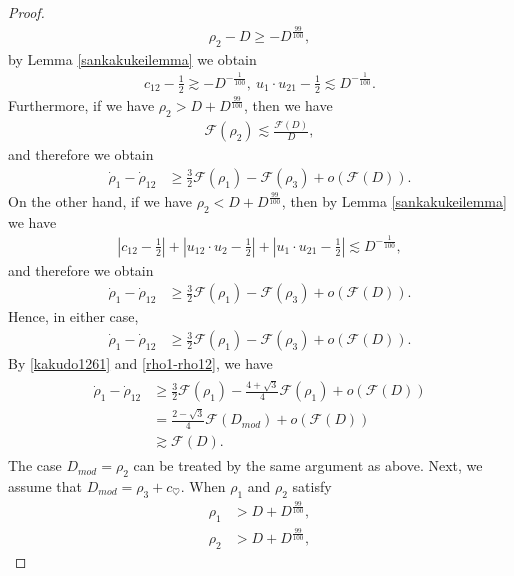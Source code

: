 \documentclass[10pt,a4paper]{amsart}
\begin{document}
\begin{proof}
\begin{align*}
\rho_{2}-D\geq -D^{\frac{99}{100}},
\end{align*}
by Lemma \ref{sankakukeilemma} we obtain
\begin{align}\label{kakudo1261}
c_{12}-\frac{1}{2}\gtrsim -D^{-\frac{1}{100}},\ u_1\cdot u_{21}-\frac{1}{2}\lesssim D^{-\frac{1}{100}}.
\end{align}
Furthermore, if we have $\rho_2>D+D^{\frac{99}{100}}$, then we have
\begin{align*}
\mathcal{F}(\rho_2)\lesssim  \frac{\mathcal{F}(D)}{D},
\end{align*}
and therefore we obtain
\begin{align*}
\dot{\rho}_1-\dot{\rho}_{12}&\geq \frac{3}{2}\mathcal{F}(\rho_1)-\mathcal{F}(\rho_3)+o\left(\mathcal{F}(D)\right).
\end{align*}
On the other hand, if we have $\rho_2<D+D^{\frac{99}{100}}$, then by Lemma \ref{sankakukeilemma} we have
\begin{align*}
\left|c_{12}-\frac{1}{2}\right|+\left|u_{12}\cdot u_2-\frac{1}{2}\right|+\left|u_1\cdot u_{21}-\frac{1}{2}\right|\lesssim D^{-\frac{1}{100}},
\end{align*}
and therefore we obtain
\begin{align*}
\dot{\rho}_1-\dot{\rho}_{12}&\geq \frac{3}{2}\mathcal{F}(\rho_1)-\mathcal{F}(\rho_3)+o\left(\mathcal{F}(D)\right).
\end{align*}
Hence, in either case,
\begin{align}\label{rho1-rho12}
\dot{\rho}_1-\dot{\rho}_{12}&\geq \frac{3}{2}\mathcal{F}(\rho_1)-\mathcal{F}(\rho_3)+o\left(\mathcal{F}(D)\right).
\end{align}
By \eqref{kakudo1261} and \eqref{rho1-rho12}, we have
\begin{align}\label{rho1minnnotoki}
\begin{aligned}
\dot{\rho}_1-\dot{\rho}_{12}&\geq\frac{3}{2}\mathcal{F}(\rho_1)-\frac{4+\sqrt{3}}{4}\mathcal{F}(\rho_1)+o\left(\mathcal{F}(D)\right)
\\
&=\frac{2-\sqrt{3}}{4}\mathcal{F}(D_{mod})+o\left(\mathcal{F}(D)\right)
\\
&\gtrsim \mathcal{F}(D).
\end{aligned}
\end{align}
The case $D_{mod}=\rho_2$ can be treated by the same argument as above. Next, we assume that $D_{mod}=\rho_3+c_{\heartsuit}$. When $\rho_1$ and $\rho_2$ satisfy
\begin{align*}
\rho_1&>D+D^{\frac{99}{100}},
\\
\rho_2&>D+D^{\frac{99}{100}},

\end{align*}
\end{proof}
\end{document}
